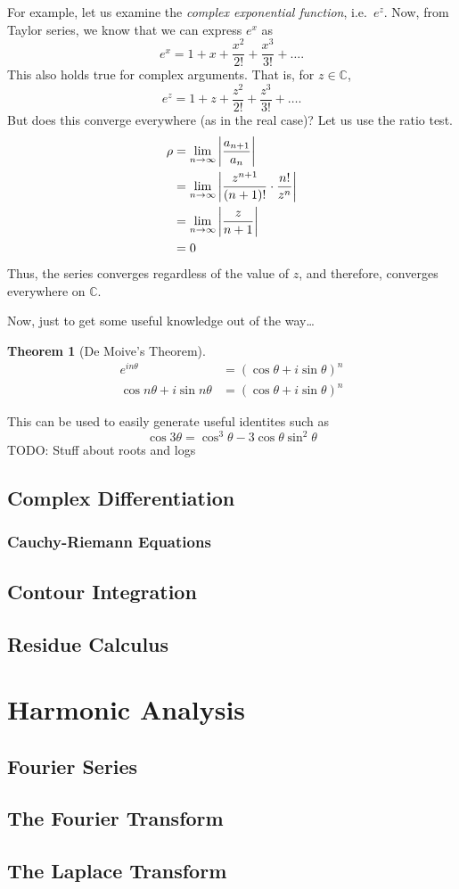 \documentclass[10pt]{scrartcl}
\numberwithin{equation}{subsection}
\theoremstyle{definition}
\newtheorem{theorem}{Theorem}[section]
\theoremstyle{remark}
\newenvironment{theoremSR}
{
\begin{siderules}
\begin{theorem}
}
{
\end{theorem}
\end{siderules}
}
\newcommand{\Complex}{\mathbb{C}}
\begin{document}
For example, let us examine the \textit{complex exponential function}, i.e.\
$e^z$. Now, from Taylor series, we know that we can express $e^x$ as
\[
e^x = 1 + x + \frac{x^2}{2!} + \frac{x^3}{3!} + \ldots.
\]
This also holds true for complex arguments. That is, for $z \in \Complex$,
\begin{equation}
e^z = 1 + z + \frac{z^2}{2!} + \frac{z^3}{3!} + \ldots.
\end{equation}
But does this converge everywhere (as in the real case)? Let us use the ratio
test.
\begin{align*}
\rho &= \lim_{n \to \infty} \abs{\frac{a_{n+1}}{a_n}} \\
 &= \lim_{n \to \infty} \abs{\frac{z^{n+1}}{(n+1)!} \cdot \frac{n!}{z^n}} \\
 &= \lim_{n \to \infty} \abs{\frac{z}{n+1}} \\
 &= 0
\end{align*}
Thus, the series converges regardless of the value of $z$, 
and therefore, converges everywhere on $\Complex$.

Now, just to get some useful knowledge out of the way\ldots
\begin{theoremSR}[De Moive's Theorem]
\begin{align*}
e^{in\theta} &= (\cos{\theta} + i \sin{\theta})^n \\
\cos{n\theta} + i \sin{n\theta} &= (\cos{\theta} + i \sin{\theta})^n
\end{align*}
\end{theoremSR}
This can be used to easily generate useful identites such as 
\[
\cos{3\theta} = \cos^3{\theta} - 3\cos{\theta}\sin^2{\theta}
\]
TODO: Stuff about roots and logs
\subsection{Complex Differentiation}
\subsubsection{Cauchy-Riemann Equations}
\subsection{Contour Integration}
\subsection{Residue Calculus}
\section{Harmonic Analysis}
\label{HarmonicAnalysis}
\subsection{Fourier Series}
\subsection{The Fourier Transform}
\subsection{The Laplace Transform}
\end{document}
